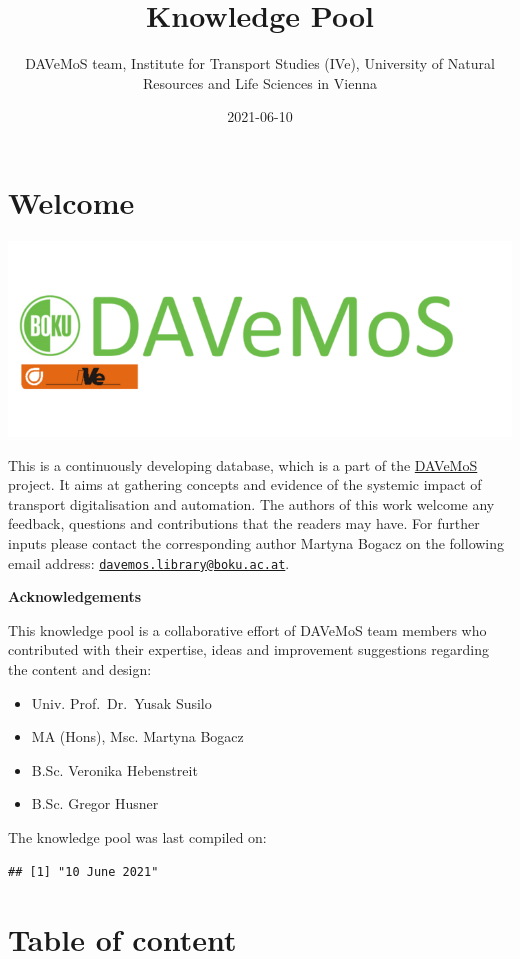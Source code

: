 \documentclass[
]{book}
\title{Knowledge Pool}
\author{DAVeMoS team, Institute for Transport Studies (IVe), University of Natural Resources and Life Sciences in Vienna}
\date{2021-06-10}
\providecommand{\tightlist}{%
  \setlength{\itemsep}{0pt}\setlength{\parskip}{0pt}}
\begin{document}
\maketitle

{
\setcounter{tocdepth}{1}
\tableofcontents
}
\hypertarget{welcome}{%
\chapter*{Welcome}\label{welcome}}

\includegraphics[width=0.4\linewidth]{image/davemos_logo}

This is a continuously developing database, which is a part of the \href{https://www.davemos.online/}{DAVeMoS} project. It aims at gathering concepts and evidence of the systemic impact of transport digitalisation and automation. The authors of this work welcome any feedback, questions and contributions that the readers may have. For further inputs please contact the corresponding author Martyna Bogacz on the following email address: \href{mailto:davemos.library@boku.ac.at}{\nolinkurl{davemos.library@boku.ac.at}}.

\textbf{Acknowledgements}

This knowledge pool is a collaborative effort of DAVeMoS team members who contributed with their expertise, ideas and improvement suggestions regarding the content and design:

\begin{itemize}
\tightlist
\item
  Univ. Prof.~Dr.~Yusak Susilo
\item
  MA (Hons), Msc. Martyna Bogacz
\item
  B.Sc. Veronika Hebenstreit
\item
  B.Sc. Gregor Husner
\end{itemize}

The knowledge pool was last compiled on:

\begin{verbatim}
## [1] "10 June 2021"
\end{verbatim}

\hypertarget{table-of-content}{%
\chapter*{Table of content}\label{table-of-content}}
\end{document}
